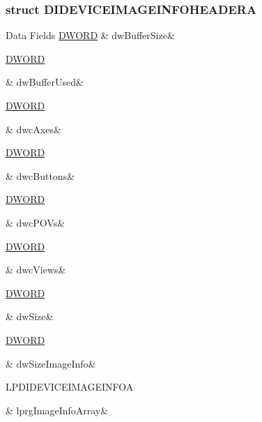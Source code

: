 \subsubsection{struct D\-I\-D\-E\-V\-I\-C\-E\-I\-M\-A\-G\-E\-I\-N\-F\-O\-H\-E\-A\-D\-E\-R\-A}
\begin{DoxyFields}{Data Fields}
\hypertarget{a00003_a92761eecb6910f4a437a95dd14171e93}{\hyperlink{a00003_a50e15ae51c87ae06ab29c8148cb5f36c}{D\-W\-O\-R\-D}}\label{a00003_a92761eecb6910f4a437a95dd14171e93}
&
dw\-Buffer\-Size&
\\
\hline

\hypertarget{a00003_a5fae77947eea6616926c56173eae3549}{\hyperlink{a00003_a50e15ae51c87ae06ab29c8148cb5f36c}{D\-W\-O\-R\-D}}\label{a00003_a5fae77947eea6616926c56173eae3549}
&
dw\-Buffer\-Used&
\\
\hline

\hypertarget{a00003_a85c21dab24dee8887fd741afbd1e1db6}{\hyperlink{a00003_a50e15ae51c87ae06ab29c8148cb5f36c}{D\-W\-O\-R\-D}}\label{a00003_a85c21dab24dee8887fd741afbd1e1db6}
&
dwc\-Axes&
\\
\hline

\hypertarget{a00003_a370c2f68f567c505f12fe1b02197c12b}{\hyperlink{a00003_a50e15ae51c87ae06ab29c8148cb5f36c}{D\-W\-O\-R\-D}}\label{a00003_a370c2f68f567c505f12fe1b02197c12b}
&
dwc\-Buttons&
\\
\hline

\hypertarget{a00003_a000038d6e7a4d9cd793760b89ee1c39c}{\hyperlink{a00003_a50e15ae51c87ae06ab29c8148cb5f36c}{D\-W\-O\-R\-D}}\label{a00003_a000038d6e7a4d9cd793760b89ee1c39c}
&
dwc\-P\-O\-Vs&
\\
\hline

\hypertarget{a00003_ae2e8ee016fee31367b976fa7f2a8833a}{\hyperlink{a00003_a50e15ae51c87ae06ab29c8148cb5f36c}{D\-W\-O\-R\-D}}\label{a00003_ae2e8ee016fee31367b976fa7f2a8833a}
&
dwc\-Views&
\\
\hline

\hypertarget{a00003_a669c5a85f5a9eb97e64ad880fadaaa2d}{\hyperlink{a00003_a50e15ae51c87ae06ab29c8148cb5f36c}{D\-W\-O\-R\-D}}\label{a00003_a669c5a85f5a9eb97e64ad880fadaaa2d}
&
dw\-Size&
\\
\hline

\hypertarget{a00003_abcc2947953dfdc55eae93c9d01cca1c7}{\hyperlink{a00003_a50e15ae51c87ae06ab29c8148cb5f36c}{D\-W\-O\-R\-D}}\label{a00003_abcc2947953dfdc55eae93c9d01cca1c7}
&
dw\-Size\-Image\-Info&
\\
\hline

\hypertarget{a00003_a26cabceb359b434073941c046d9c53ac}{L\-P\-D\-I\-D\-E\-V\-I\-C\-E\-I\-M\-A\-G\-E\-I\-N\-F\-O\-A}\label{a00003_a26cabceb359b434073941c046d9c53ac}
&
lprg\-Image\-Info\-Array&
\\
\hline

\end{DoxyFields}
\label{d2/db1/a00070}
\hypertarget{a00003_d2/db1/a00070}{}
